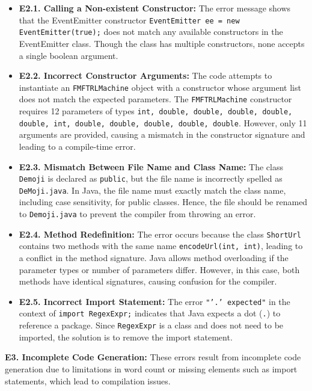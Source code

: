 \begin{itemize}[left=10pt]
    \item \textbf{E2.1. Calling a Non-existent Constructor:}  
    The error message shows that the EventEmitter constructor \texttt{EventEmitter ee = new EventEmitter(true);} does not match any available constructors in the EventEmitter class. Though the class has multiple constructors, none accepts a single boolean argument.
    
    \item \textbf{E2.2. Incorrect Constructor Arguments:}  
    The code attempts to instantiate an \texttt{FMFTRLMachine} object with a constructor whose argument list does not match the expected parameters. The \texttt{FMFTRLMachine} constructor requires 12 parameters of types \texttt{int, double, double, double, double, double, int, double, double, double, double, double}. However, only 11 arguments are provided, causing a mismatch in the constructor signature and leading to a compile-time error.
    
    \item \textbf{E2.3. Mismatch Between File Name and Class Name:}  
    The class \texttt{Demoji} is declared as \texttt{public}, but the file name is incorrectly spelled as \texttt{DeMoji.java}. In Java, the file name must exactly match the class name, including case sensitivity, for public classes. Hence, the file should be renamed to \texttt{Demoji.java} to prevent the compiler from throwing an error.
    
    \item \textbf{E2.4. Method Redefinition:}  
    The error occurs because the class \texttt{ShortUrl} contains two methods with the same name \texttt{encodeUrl(int, int)}, leading to a conflict in the method signature. Java allows method overloading if the parameter types or number of parameters differ. However, in this case, both methods have identical signatures, causing confusion for the compiler.
    
    \item \textbf{E2.5. Incorrect Import Statement:}  
    The error \texttt{"'.' expected"} in the context of \texttt{import RegexExpr;} indicates that Java expects a dot (\texttt{.}) to reference a package. Since \texttt{RegexExpr} is a class and does not need to be imported, the solution is to remove the import statement.
\end{itemize}

\textbf{E3. Incomplete Code Generation:}
These errors result from incomplete code generation due to limitations in word count or missing elements such as import statements, which lead to compilation issues.

